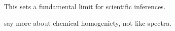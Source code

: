 \documentclass[modern]{aastex631}
\newcommand{\todo}[1]{\textcolor{tab:red}{#1}}
\begin{document}
This sets a fundamental limit for scientific inferences. 



\todo{say more about chemical homogeniety, not like spectra.}

\end{document}
